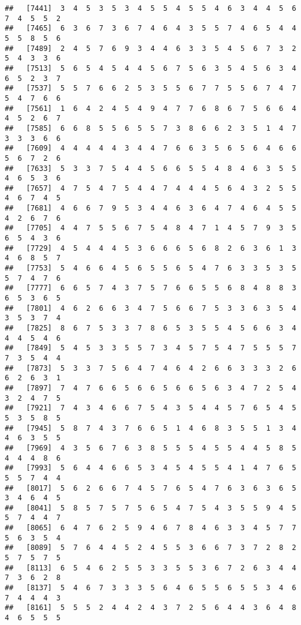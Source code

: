 \documentclass[
]{book}
\begin{document}
\begin{verbatim}
##   [7441]  3  4  5  3  5  3  4  5  5  4  5  5  4  6  3  4  4  5  6  7  4  5  5  2
##   [7465]  6  3  6  7  3  6  7  4  6  4  3  5  5  7  4  6  5  4  4  5  5  8  5  6
##   [7489]  2  4  5  7  6  9  3  4  4  6  3  3  5  4  5  6  7  3  2  5  4  3  3  6
##   [7513]  5  6  5  4  5  4  4  5  6  7  5  6  3  5  4  5  6  3  4  6  5  2  3  7
##   [7537]  5  5  7  6  6  2  5  3  5  5  6  7  7  5  5  6  7  4  7  5  4  7  6  6
##   [7561]  1  6  4  2  4  5  4  9  4  7  7  6  8  6  7  5  6  6  4  4  5  2  6  7
##   [7585]  6  6  8  5  5  6  5  5  7  3  8  6  6  2  3  5  1  4  7  3  3  3  6  6
##   [7609]  4  4  4  4  4  3  4  4  7  6  6  3  5  6  5  6  4  6  6  5  6  7  2  6
##   [7633]  5  3  3  7  5  4  4  5  6  6  5  5  4  8  4  6  3  5  5  4  6  5  3  6
##   [7657]  4  7  5  4  7  5  4  4  7  4  4  4  5  6  4  3  2  5  5  4  6  7  4  5
##   [7681]  4  6  6  7  9  5  3  4  4  6  3  6  4  7  4  6  4  5  5  4  2  6  7  6
##   [7705]  4  4  7  5  5  6  7  5  4  8  4  7  1  4  5  7  9  3  5  6  5  4  3  6
##   [7729]  4  5  4  4  4  5  3  6  6  6  5  6  8  2  6  3  6  1  3  4  6  8  5  7
##   [7753]  5  4  6  6  4  5  6  5  5  6  5  4  7  6  3  3  5  3  5  5  7  4  7  6
##   [7777]  6  6  5  7  4  3  7  5  7  6  6  5  5  6  8  4  8  8  3  6  5  3  6  5
##   [7801]  4  6  2  6  6  3  4  7  5  6  6  7  5  3  3  6  3  5  4  3  5  3  7  4
##   [7825]  8  6  7  5  3  3  7  8  6  5  3  5  5  4  5  6  6  3  4  4  4  5  4  6
##   [7849]  5  4  5  3  3  5  5  7  3  4  5  7  5  4  7  5  5  5  7  7  3  5  4  4
##   [7873]  5  3  3  7  5  6  4  7  4  6  4  2  6  6  3  3  3  2  6  6  2  6  3  1
##   [7897]  7  4  7  6  6  5  6  6  5  6  6  5  6  3  4  7  2  5  4  3  2  4  7  5
##   [7921]  7  4  3  4  6  6  7  5  4  3  5  4  4  5  7  6  5  4  5  5  3  5  8  5
##   [7945]  5  8  7  4  3  7  6  6  5  1  4  6  8  3  5  5  1  3  4  4  6  3  5  5
##   [7969]  4  3  5  6  7  6  3  8  5  5  5  4  5  5  4  4  5  8  5  4  4  4  8  6
##   [7993]  5  6  4  4  6  6  5  3  4  5  4  5  5  4  1  4  7  6  5  5  5  7  4  4
##   [8017]  5  6  2  6  6  7  4  5  7  6  5  4  7  6  3  6  3  6  5  3  4  6  4  5
##   [8041]  5  8  5  7  5  7  5  6  5  4  7  5  4  3  5  5  9  4  5  5  7  4  4  7
##   [8065]  6  4  7  6  2  5  9  4  6  7  8  4  6  3  3  4  5  7  7  5  6  3  5  4
##   [8089]  5  7  6  4  4  5  2  4  5  5  3  6  6  7  3  7  2  8  2  5  7  5  7  5
##   [8113]  6  5  4  6  2  5  5  3  3  5  5  3  6  7  2  6  3  4  4  7  3  6  2  8
##   [8137]  5  4  6  7  3  3  3  5  6  4  6  5  5  6  5  5  3  4  6  7  4  4  4  3
##   [8161]  5  5  5  2  4  4  2  4  3  7  2  5  6  4  4  3  6  4  8  4  6  5  5  5

\end{verbatim}
\end{document}
